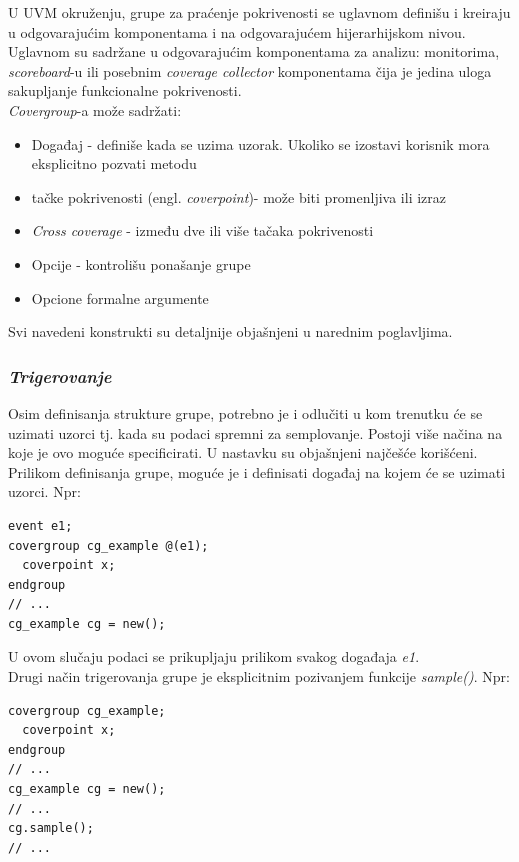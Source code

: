 U UVM okruženju, grupe za praćenje pokrivenosti se uglavnom definišu i kreiraju
u odgovarajućim komponentama i na odgovarajućem hijerarhijskom nivou. Uglavnom
su sadržane u odgovarajućim komponentama za analizu: monitorima,
\emph{scoreboard}-u ili posebnim \emph{coverage collector} komponentama čija je
jedina uloga sakupljanje funkcionalne pokrivenosti.\\

\emph{Covergroup}-a može sadržati:

\begin{itemize}
\item Događaj - definiše kada se uzima uzorak. Ukoliko se izostavi korisnik
  mora eksplicitno pozvati metodu
\item tačke pokrivenosti (engl. \emph{coverpoint})- može biti promenljiva ili
  izraz
\item \emph{Cross coverage} - između dve ili više tačaka pokrivenosti
\item Opcije - kontrolišu ponašanje grupe
\item Opcione formalne argumente
\end{itemize}

Svi navedeni konstrukti su detaljnije objašnjeni u narednim poglavljima.

\subsubsection{\emph{Trigerovanje}}

Osim definisanja strukture grupe, potrebno je i odlučiti u kom trenutku će se
uzimati uzorci tj. kada su podaci spremni za semplovanje. Postoji više načina na
koje je ovo moguće specificirati. U nastavku su objašnjeni najčešće korišćeni.\\

Prilikom definisanja grupe, moguće je i definisati događaj na kojem će se
uzimati uzorci. Npr:

\begin{lstlisting}
event e1;
covergroup cg_example @(e1);
  coverpoint x;
endgroup
// ...
cg_example cg = new();
\end{lstlisting}

U ovom slučaju podaci se prikupljaju prilikom svakog događaja \emph{e1}.\\

Drugi način trigerovanja grupe je eksplicitnim pozivanjem funkcije
\emph{sample()}. Npr:

\begin{lstlisting}
covergroup cg_example;
  coverpoint x;
endgroup
// ...
cg_example cg = new();
// ...
cg.sample();
// ...
\end{lstlisting}

